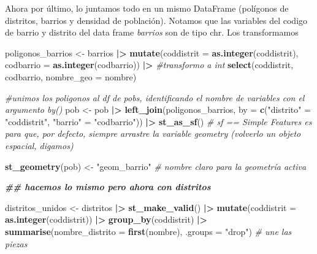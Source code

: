 \documentclass[notspecified,article,submit,moreauthors,pdftex]{Definitions/mdpi}
\newenvironment{Shaded}{\begin{snugshade}}{\end{snugshade}}
\newcommand{\AttributeTok}[1]{\textcolor[rgb]{0.13,0.29,0.53}{#1}}
\newcommand{\CommentTok}[1]{\textcolor[rgb]{0.56,0.35,0.01}{\textit{#1}}}
\newcommand{\DocumentationTok}[1]{\textcolor[rgb]{0.56,0.35,0.01}{\textbf{\textit{#1}}}}
\newcommand{\FunctionTok}[1]{\textcolor[rgb]{0.13,0.29,0.53}{\textbf{#1}}}
\newcommand{\NormalTok}[1]{#1}
\newcommand{\OtherTok}[1]{\textcolor[rgb]{0.56,0.35,0.01}{#1}}
\newcommand{\SpecialCharTok}[1]{\textcolor[rgb]{0.81,0.36,0.00}{\textbf{#1}}}
\newcommand{\StringTok}[1]{\textcolor[rgb]{0.31,0.60,0.02}{#1}}
\begin{document}
Ahora por último, lo juntamos todo en un mismo DataFrame (polígonos de
distritos, barrios y densidad de población). Notamos que las variables
del codigo de barrio y distrito del data frame \emph{barrios} son de
tipo chr. Los transformamos

\begin{Shaded}
\begin{Highlighting}[]
\NormalTok{poligonos\_barrios }\OtherTok{\textless{}{-}}\NormalTok{ barrios }\SpecialCharTok{|\textgreater{}}
          \FunctionTok{mutate}\NormalTok{(}\AttributeTok{coddistrit =} \FunctionTok{as.integer}\NormalTok{(coddistrit),}
         \AttributeTok{codbarrio  =} \FunctionTok{as.integer}\NormalTok{(codbarrio)) }\SpecialCharTok{|\textgreater{}} \CommentTok{\#transformo a int}
  \FunctionTok{select}\NormalTok{(coddistrit, codbarrio, }\AttributeTok{nombre\_geo =}\NormalTok{ nombre) }


\CommentTok{\#unimos los poligonos al df de pobs, identificando el nombre de variables con el argumento by()}
\NormalTok{pob }\OtherTok{\textless{}{-}}\NormalTok{ pob }\SpecialCharTok{|\textgreater{}}
  \FunctionTok{left\_join}\NormalTok{(poligonos\_barrios,}
            \AttributeTok{by =} \FunctionTok{c}\NormalTok{(}\StringTok{"distrito"} \OtherTok{=} \StringTok{"coddistrit"}\NormalTok{, }\StringTok{"barrio"} \OtherTok{=} \StringTok{"codbarrio"}\NormalTok{)) }\SpecialCharTok{|\textgreater{}}
  \FunctionTok{st\_as\_sf}\NormalTok{() }\CommentTok{\# sf == Simple Features es para que, por defecto, siempre arrastre la variable geometry (volverlo un objeto espacial, digamos)}

\FunctionTok{st\_geometry}\NormalTok{(pob) }\OtherTok{\textless{}{-}} \StringTok{"geom\_barrio"}   \CommentTok{\# nombre claro para la geometría activa}


\DocumentationTok{\#\# hacemos lo mismo pero ahora con distritos}

\NormalTok{distritos\_unidos }\OtherTok{\textless{}{-}}\NormalTok{ distritos }\SpecialCharTok{|\textgreater{}}
  \FunctionTok{st\_make\_valid}\NormalTok{() }\SpecialCharTok{|\textgreater{}}
  \FunctionTok{mutate}\NormalTok{(}\AttributeTok{coddistrit =} \FunctionTok{as.integer}\NormalTok{(coddistrit)) }\SpecialCharTok{|\textgreater{}}
  \FunctionTok{group\_by}\NormalTok{(coddistrit) }\SpecialCharTok{|\textgreater{}}
  \FunctionTok{summarise}\NormalTok{(}\AttributeTok{nombre\_distrito =} \FunctionTok{first}\NormalTok{(nombre), }\AttributeTok{.groups =} \StringTok{"drop"}\NormalTok{)  }\CommentTok{\# une las piezas}


\end{Highlighting}
\end{Shaded}
\end{document}
